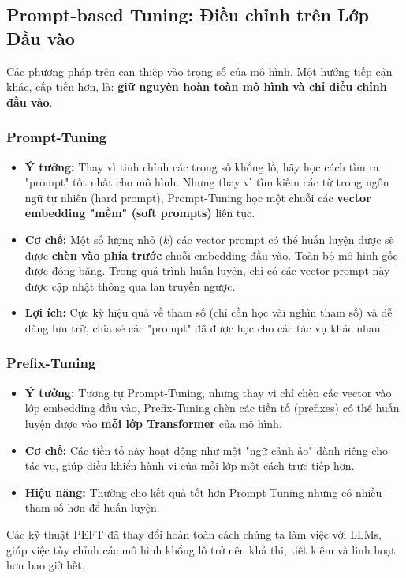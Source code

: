 \subsection{Prompt-based Tuning: Điều chỉnh trên Lớp Đầu vào}
\label{ssec:prompt_tuning}
Các phương pháp trên can thiệp vào trọng số của mô hình. Một hướng tiếp cận khác, cấp tiến hơn, là: \textbf{giữ nguyên hoàn toàn mô hình và chỉ điều chỉnh đầu vào}.

\subsubsection{Prompt-Tuning}
\begin{itemize}
    \item \textbf{Ý tưởng:} Thay vì tinh chỉnh các trọng số khổng lồ, hãy học cách tìm ra "prompt" tốt nhất cho mô hình. Nhưng thay vì tìm kiếm các từ trong ngôn ngữ tự nhiên (hard prompt), Prompt-Tuning \cite{lester2021power} học một chuỗi các \textbf{vector embedding "mềm" (soft prompts)} liên tục.
    \item \textbf{Cơ chế:} Một số lượng nhỏ ($k$) các vector prompt có thể huấn luyện được sẽ được \textbf{chèn vào phía trước} chuỗi embedding đầu vào. Toàn bộ mô hình gốc được đóng băng. Trong quá trình huấn luyện, chỉ có các vector prompt này được cập nhật thông qua lan truyền ngược.
    \item \textbf{Lợi ích:} Cực kỳ hiệu quả về tham số (chỉ cần học vài nghìn tham số) và dễ dàng lưu trữ, chia sẻ các "prompt" đã được học cho các tác vụ khác nhau.
\end{itemize}

\subsubsection{Prefix-Tuning}
\begin{itemize}
    \item \textbf{Ý tưởng:} Tương tự Prompt-Tuning, nhưng thay vì chỉ chèn các vector vào lớp embedding đầu vào, Prefix-Tuning \cite{li2021prefix} chèn các tiền tố (prefixes) có thể huấn luyện được vào \textbf{mỗi lớp Transformer} của mô hình.
    \item \textbf{Cơ chế:} Các tiền tố này hoạt động như một "ngữ cảnh ảo" dành riêng cho tác vụ, giúp điều khiển hành vi của mỗi lớp một cách trực tiếp hơn.
    \item \textbf{Hiệu năng:} Thường cho kết quả tốt hơn Prompt-Tuning nhưng có nhiều tham số hơn để huấn luyện.
\end{itemize}

Các kỹ thuật PEFT đã thay đổi hoàn toàn cách chúng ta làm việc với LLMs, giúp việc tùy chỉnh các mô hình khổng lồ trở nên khả thi, tiết kiệm và linh hoạt hơn bao giờ hết.